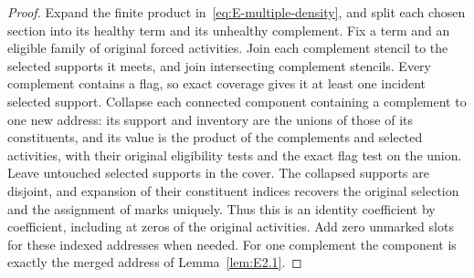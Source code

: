 \begin{proof}
Expand the finite product in~\eqref{eq:E-multiple-density}, and split
each chosen section into its healthy term and its unhealthy complement.
Fix a term and an eligible family of original forced activities. Join
each complement stencil to the selected supports it meets, and join
intersecting complement stencils. Every complement contains a flag, so
exact coverage gives it at least one incident selected support. Collapse
each connected component containing a complement to one new address:
its support and inventory are the unions of those of its constituents,
and its value is the product of the complements and selected activities,
with their original eligibility tests and the exact flag test on the
union. Leave untouched selected supports in the cover. The collapsed
supports are disjoint, and expansion of their constituent indices
recovers the original selection and the assignment of marks uniquely.
Thus this is an identity coefficient by coefficient, including at zeros
of the original activities. Add zero unmarked slots for these indexed
addresses when needed. For one complement the component is exactly the
merged address of Lemma~\ref{lem:E2.1}.


\end{proof}
